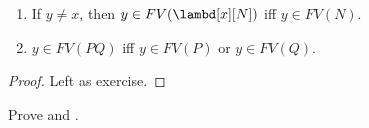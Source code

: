 \documentclass[../../../include/open-logic-section]{subfiles}
\begin{document}
\begin{lem}
  \begin{enumerate}
    \item {} If $y \neq x$, then $y \in FV(\lambd[x][N])$ iff $y \in
    FV(N)$.
    \item {} $y \in FV(PQ)$ iff $y \in FV(P)$ or
      $y \in FV(Q)$.
    \end{enumerate}
\end{lem}
\begin{proof}
  Left as exercise.
\end{proof}

\begin{prob}
  Prove  and .
\end{prob}
\end{document}
